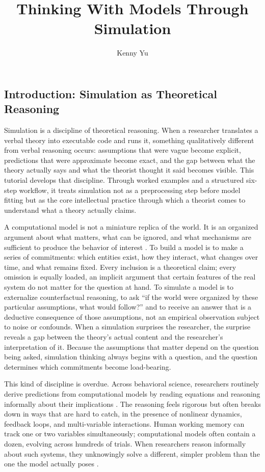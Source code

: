 \documentclass[fleqn,10pt]{wlscirep}
\title{Thinking With Models Through Simulation}
\author[1,*]{Kenny Yu}
\affil[1]{KU Leuven, Leuven, Belgium}
\affil[*]{kenny.yu@kuleuven.be}
\begin{document}
\flushbottom
\maketitle
\thispagestyle{empty}

\begin{linenumbers}

\section*{Introduction: Simulation as Theoretical Reasoning}

Simulation is a discipline of theoretical reasoning. When a researcher translates a verbal theory into executable code and runs it, something qualitatively different from verbal reasoning occurs: assumptions that were vague become explicit, predictions that were approximate become exact, and the gap between what the theory actually says and what the theorist thought it said becomes visible. This tutorial develops that discipline. Through worked examples and a structured six-step workflow, it treats simulation not as a preprocessing step before model fitting but as the core intellectual practice through which a theorist comes to understand what a theory actually claims.

A computational model is not a miniature replica of the world. It is an organized argument about what matters, what can be ignored, and what mechanisms are sufficient to produce the behavior of interest \citep{winsberg2010science}. To build a model is to make a series of commitments: which entities exist, how they interact, what changes over time, and what remains fixed. Every inclusion is a theoretical claim; every omission is equally loaded, an implicit argument that certain features of the real system do not matter for the question at hand. To simulate a model is to externalize counterfactual reasoning, to ask ``if the world were organized by these particular assumptions, what would follow?'' and to receive an answer that is a deductive consequence of those assumptions, not an empirical observation subject to noise or confounds. When a simulation surprises the researcher, the surprise reveals a gap between the theory's actual content and the researcher's interpretation of it. Because the assumptions that matter depend on the question being asked, simulation thinking always begins with a question, and the question determines which commitments become load-bearing.

This kind of discipline is overdue. Across behavioral science, researchers routinely derive predictions from computational models by reading equations and reasoning informally about their implications \citep{oberauer2019addressing, robinaugh2021invisible}. The reasoning feels rigorous but often breaks down in ways that are hard to catch, in the presence of nonlinear dynamics, feedback loops, and multi-variable interactions. Human working memory can track one or two variables simultaneously; computational models often contain a dozen, evolving across hundreds of trials. When researchers reason informally about such systems, they unknowingly solve a different, simpler problem than the one the model actually poses \citep{smaldino2017models, meehl1990summaries}.


\end{linenumbers}
\end{document}
